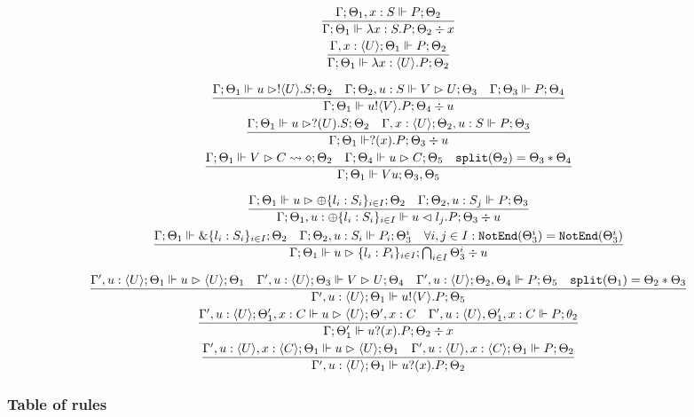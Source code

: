 \begin{gather*}
\frac{\Gamma ; \Theta_1 , x : S \Vdash P ; \Theta_2}{\Gamma ; \Theta_1 \Vdash \lambda x : S . P ; \Theta_2 \div x} \\
\frac{\Gamma, x : \langle U \rangle ; \Theta_1 \Vdash P ; \Theta_2}{\Gamma ; \Theta_1 \Vdash \lambda x : \langle U \rangle . P ; \Theta_2} \\
\end{gather*}

\begin{gather*}
\frac{\Gamma ; \Theta_1 \Vdash u \vartriangleright !\langle U \rangle . S ; \Theta_2 \quad \Gamma ; \Theta_2 , u : S \Vdash V \vartriangleright U ; \Theta_3 \quad \Gamma ; \Theta_3 \Vdash P ; \Theta_4}{\Gamma ; \Theta_1 \Vdash u ! \langle V \rangle . P ; \Theta_4 \div u} \\
\frac{\Gamma ; \Theta_1 \Vdash u \vartriangleright ?(U) . S ; \Theta_2 \quad \Gamma, x : \langle U \rangle ; \Theta_2 , u : S \Vdash P ; \Theta_3}{\Gamma ; \Theta_1 \Vdash ? (x) . P ; \Theta_3 \div u} \\
\frac{\Gamma ; \Theta_1 \Vdash V \vartriangleright C \leadsto \diamond ; \Theta_2 \quad \Gamma ; \Theta_4 \Vdash u \vartriangleright C ; \Theta_5 \quad \texttt{split}(\Theta_2) = \Theta_3 * \Theta_4}{\Gamma ; \Theta_1 \Vdash V u ; \Theta_3 , \Theta_5}
\end{gather*}

\begin{gather*}
\frac{\Gamma ; \Theta_1 \Vdash u \vartriangleright \oplus \{l_i : S_i\}_{i\in I}; \Theta_2 \quad \Gamma ; \Theta_2 , u : S_j \Vdash P ; \Theta_3}{\Gamma ; \Theta_1 , u : \oplus\{l_i : S_i\}_{i \in I} \Vdash u \vartriangleleft l_j . P ; \Theta_3 \div u} \\
\frac{\Gamma ; \Theta_1 \Vdash \& \{l_i : S_i\}_{i \in I}; \Theta_2 \quad \Gamma ; \Theta_2 , u : S_i \Vdash P_i ; \Theta^i_3 \quad \forall i,j \in I : \texttt{NotEnd}(\Theta^i_3) = \texttt{NotEnd}(\Theta_3^i)}{\Gamma ; \Theta_1 \Vdash u \vartriangleright \{l_i : P_i\}_{i \in I} ; \bigcap_{i \in I} \Theta_3^i \div u} \\
\end{gather*}

\begin{gather*}
\frac{\Gamma' , u : \langle U \rangle ; \Theta_1 \Vdash u \vartriangleright \langle U \rangle ; \Theta_1 \quad \Gamma' , u : \langle U \rangle ; \Theta_3 \Vdash V \vartriangleright U ; \Theta_4 \quad \Gamma', u : \langle U \rangle ; \Theta_2, \Theta_4 \Vdash P ; \Theta_5 \quad \texttt{split}(\Theta_1) = \Theta_2 * \Theta_3}{\Gamma', u : \langle U \rangle ; \Theta_1 \Vdash u ! \langle V \rangle . P ; \Theta_5} \\
\frac{\Gamma' , u : \langle U \rangle ; \Theta_1', x : C \Vdash u \vartriangleright \langle U \rangle ; \Theta' , x : C \quad \Gamma' , u : \langle U \rangle , \Theta_1', x : C \Vdash P ; \theta_2}{\Gamma ; \Theta_1' \Vdash u ? (x) . P ; \Theta_2 \div x} \\
\frac{\Gamma' , u : \langle U \rangle , x : \langle C \rangle ; \Theta_1 \Vdash u \vartriangleright \langle U \rangle ; \Theta_1 \quad \Gamma' , u : \langle U \rangle , x : \langle C \rangle ; \Theta_1 \Vdash P ; \Theta_2}{\Gamma', u : \langle U \rangle ; \Theta_1 \Vdash u ? (x) . P ; \Theta_2} \\
\end{gather*}

\subsubsection{Table of rules}

